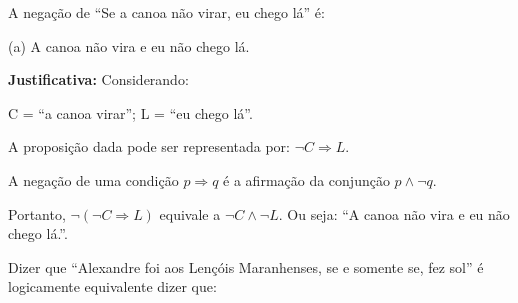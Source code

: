 \documentclass[12pt, a4paper, onecolumn]{exam}
\begin{document}
\begin{questions}
\begin{solution}
    \end{solution}
    
    \question[q10] A negação de “Se a canoa não virar, eu chego lá” é: 
    

    \begin{solution}
        (a) A canoa não vira e eu não chego lá.

        \textbf{Justificativa:} Considerando:

            C = “a canoa virar”; \hfill
            L = “eu chego lá”. 

            A proposição dada pode ser representada por: \( \neg C \Rightarrow L \).

            A negação de uma condição \( p \Rightarrow q \) é a afirmação da conjunção \( p \wedge \neg q \).

            Portanto, \( \neg ( \neg C \Rightarrow L ) \) equivale a \( \neg C \wedge \neg L \). Ou seja:  “A canoa não vira e eu não chego lá.”.
        
        \end{solution}
    
    \pagebreak
    
    \question[q11] Dizer que “Alexandre foi aos Lençóis Maranhenses, se e somente se, fez sol” é logicamente equivalente dizer que: 
    
    \begin{parts}

\end{parts}
\end{questions}
\end{document}
